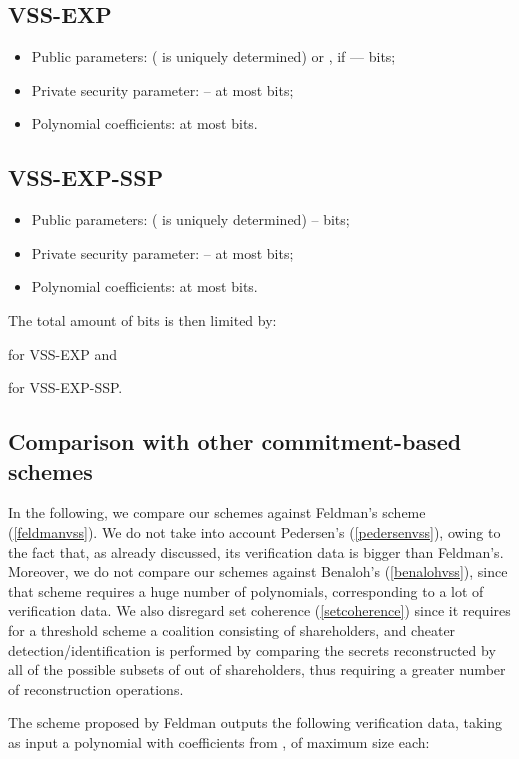 \documentclass[10pt,journal,cspaper,compsoc]{IEEEtran}
\begin{document}
\subsection{VSS-EXP}

\begin{itemize}
\item Public parameters:  ( is uniquely determined) or , if  ---  bits;
\item Private security parameter:  -- at most  bits;
\item Polynomial coefficients: at most  bits.
\end{itemize}


\subsection{VSS-EXP-SSP}

\begin{itemize}
\item Public parameters:  ( is uniquely determined) --  bits;
\item Private security parameter:  -- at most  bits;
\item Polynomial coefficients: at most  bits.
\end{itemize}

The total amount of bits is then limited by:

for VSS-EXP and

for VSS-EXP-SSP.

\subsection{Comparison with other commitment-based schemes}
In the following, we compare our schemes against Feldman's scheme  (\ref{feldmanvss}). We do not take into account Pedersen's (\ref{pedersenvss}), owing to the fact that, as already discussed, its verification data is bigger than Feldman's. Moreover, we do not compare our schemes against Benaloh's (\ref{benalohvss}), since that scheme requires a huge number of polynomials, corresponding to a lot of verification data. We also disregard set coherence (\ref{setcoherence}) since it requires for a  threshold scheme a coalition consisting of  shareholders, and cheater detection/identification is performed by comparing the secrets reconstructed by all of the possible subsets of  out of  shareholders, thus requiring a greater number of reconstruction operations.  

The scheme proposed by Feldman outputs the following verification data, taking as input a polynomial  with  coefficients from , of maximum size  each:
\end{document}
